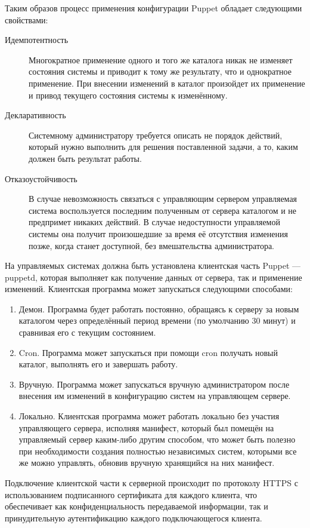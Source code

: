   Таким образов процесс применения конфигурации Puppet обладает следующими свойствами:
\begin{description}
\item[Идемпотентность] Многократное применение одного и того же каталога никак не изменяет состояния системы и приводит к тому же результату, что и однократное применение. При внесении изменений в каталог произойдет их применение и привод текущего состояния системы к изменённому.
\item[Декларативность] Системному администратору требуется описать не порядок действий, который нужно выполнить для решения поставленной задачи, а то, каким должен быть результат работы.
\item[Отказоустойчивость] В случае невозможность связаться с управляющим сервером управляемая система воспользуется последним полученным от сервера каталогом и не предпримет никаких действий. В случае недоступности управляемой системы она получит произошедшие за время её отсутствия изменения позже, когда станет доступной, без вмешательства администратора.
\end{description}

	На управляемых системах должна быть установлена клиентская часть Puppet — puppetd, которая выполняет как получение данных от сервера, так и применение изменений. Клиентская программа может запускаться следующими способами:
\begin{enumerate}
\item Демон. Программа будет работать постоянно, обращаясь к серверу за новым каталогом через определённый период времени (по умолчанию 30 минут) и сравнивая его с текущим состоянием.
\item Cron. Программа может запускаться при помощи cron получать новый каталог, выполнять его и завершать работу.
\item Вручную. Программа может запускаться вручную администратором после внесения им изменений в конфигурацию систем на управляющем сервере.
\item Локально. Клиентская программа может работать локально без участия управляющего сервера, исполняя манифест, который был помещён на управляемый сервер каким-либо другим способом, что может быть полезно при необходимости создания полностью независимых систем, которыми все же можно управлять, обновив вручную хранящийся на них манифест.
\end{enumerate}

  Подключение клиентской части к серверной происходит по протоколу HTTPS с использованием подписанного сертификата для каждого клиента, что обеспечивает как конфиденциальность передаваемой информации, так и принудительную аутентификацию каждого подключающегося клиента.